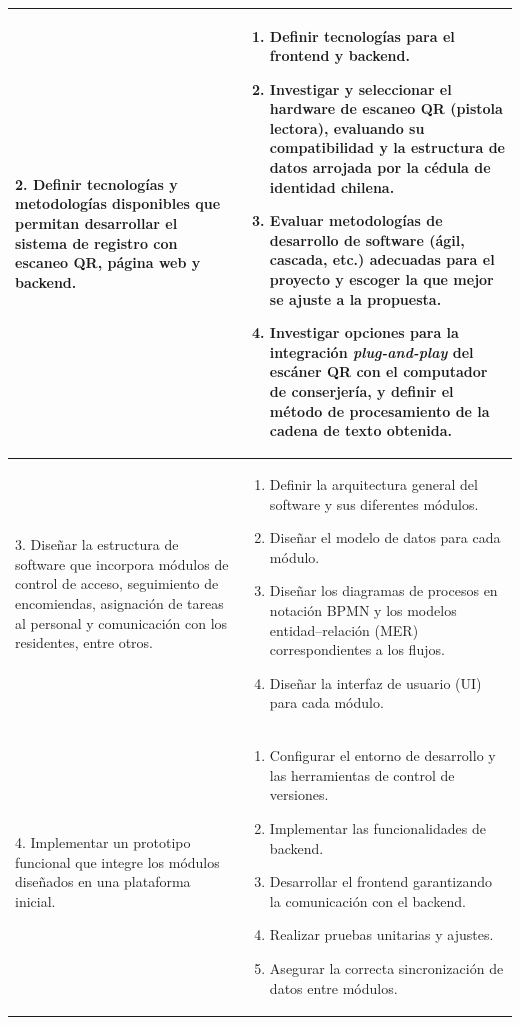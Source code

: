 \begin{longtable}{|p{}|p{}|}
2. Definir tecnologías y metodologías disponibles que permitan desarrollar el sistema de registro con escaneo QR, página web y backend. &
\begin{enumerate}
    \item Definir tecnologías para el frontend y backend.
    \item Investigar y seleccionar el hardware de escaneo QR (pistola lectora), evaluando su compatibilidad  y la estructura de datos arrojada por la cédula de identidad chilena.
    \item Evaluar metodologías de desarrollo de software (ágil, cascada, etc.) adecuadas para el proyecto y escoger la que mejor se ajuste a la propuesta.
    \item Investigar opciones para la integración \textit{plug-and-play} del escáner QR con el computador de conserjería, y definir el método de procesamiento de la cadena de texto obtenida.
\end{enumerate}
\\ \hline

3. Diseñar la estructura de software que incorpora módulos de control de acceso, seguimiento de encomiendas, asignación de tareas al personal y comunicación con los residentes, entre otros. &
\begin{enumerate}
    \item Definir la arquitectura general del software y sus diferentes módulos.
    \item Diseñar el modelo de datos para cada módulo.
    \item Diseñar los diagramas de procesos en notación BPMN y los modelos entidad–relación (MER) correspondientes a los flujos.
    \item Diseñar la interfaz de usuario (UI) para cada módulo.
\end{enumerate}
\\ \hline

4. Implementar un prototipo funcional que integre los módulos diseñados en una plataforma inicial. &
\begin{enumerate}
    \item Configurar el entorno de desarrollo y las herramientas de control de versiones.
    \item Implementar las funcionalidades de backend.
    \item Desarrollar el frontend garantizando la comunicación con el backend.
    \item Realizar pruebas unitarias y ajustes.
    \item Asegurar la correcta sincronización de datos entre módulos.
\end{enumerate}
\\ \hline


\end{longtable}
